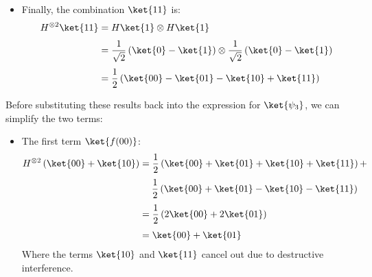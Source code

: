 \begin{enumerate}[label={\textbf{Step \arabic*.}}, leftmargin=2cm]
\begin{itemize}
            \item Finally, the combination $\ket{11}$ is:
                \begin{align*}
                    H^{\otimes 2} \ket{11} &= H\ket{1} \otimes H\ket{1} \\[.3em]
                    &= \frac{1}{\sqrt{2}} \left(\ket{0} - \ket{1}\right) \otimes \frac{1}{\sqrt{2}} \left(\ket{0} - \ket{1}\right) \\[.3em]
                    &= \frac{1}{2} \left(\ket{00} - \ket{01} - \ket{10} + \ket{11}\right)
                \end{align*}
        \end{itemize}
        Before substituting these results back into the expression for $\ket{\psi_3}$, we can simplify the two terms:
        \begin{itemize}
            \item The first term $\ket{f(00)}$:
                \begin{align*}
                    H^{\otimes 2} \left(\ket{00} + \ket{10}\right)
                    &=
                    \frac{1}{2} \left(\ket{00} + \ket{01} + \ket{10} + \ket{11}\right)
                    +\\[.3em]
                    &\quad\; \frac{1}{2} \left(\ket{00} + \ket{01} - \ket{10} - \ket{11}\right) \\[.3em]
                    &=
                    \frac{1}{2} \left(
                        2\ket{00} + 2\ket{01}
                    \right) \\[.3em]
                    &=
                    \ket{00} + \ket{01}
                \end{align*}
                Where the terms $\ket{10}$ and $\ket{11}$ cancel out due to destructive interference.


\end{itemize}
\end{enumerate}
